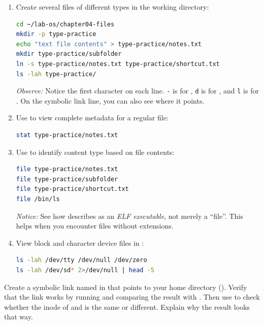 \begin{enumerate}
    \item Create several files of different types in the working directory:
\begin{lstlisting}[language=bash, caption={Creating a regular file and directory}]
cd ~/lab-os/chapter04-files
mkdir -p type-practice
echo "text file contents" > type-practice/notes.txt
mkdir type-practice/subfolder
ln -s type-practice/notes.txt type-practice/shortcut.txt
ls -lah type-practice/
\end{lstlisting}
    \textit{Observe:} Notice the first character on each line. \texttt{-} is for , \texttt{d} is for , and \texttt{l} is for . On the symbolic link line, you can also see where it points.

    \item Use  to view complete metadata for a regular file:
\begin{lstlisting}[language=bash, caption={Viewing complete metadata with stat}]
stat type-practice/notes.txt
\end{lstlisting}

    \item Use  to identify content type based on file contents:
\begin{lstlisting}[language=bash, caption={Detecting file type with file}]
file type-practice/notes.txt
file type-practice/subfolder
file type-practice/shortcut.txt
file /bin/ls
\end{lstlisting}
    \textit{Notice:} See how  describes  as an \textit{ELF executable}, not merely a ``file''. This helps when you encounter files without extensions.

    \item View block and character device files in :
\begin{lstlisting}[language=bash, caption={Viewing device files in /dev}]
ls -lah /dev/tty /dev/null /dev/zero
ls -lah /dev/sd* 2>/dev/null | head -5
\end{lstlisting}
\end{enumerate}

\begin{challengebox}
Create a symbolic link named  in  that points to your home directory (\dir{~/}). Verify that the link works by running  and comparing the result with . Then use  to check whether the inode of  and \dir{~/} is the same or different. Explain why the result looks that way.
\end{challengebox}


